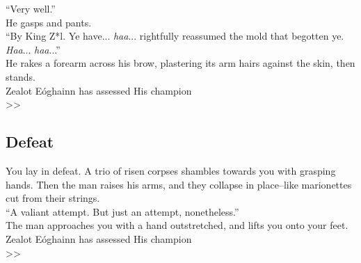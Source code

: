 “Very well.”\\

He gasps and pants.\\
“By King Z*l. Ye have... \emph{haa}... rightfully reassumed the mold that begotten ye. \emph{Haa}... \emph{haa}...”\\

He rakes a forearm across his brow, plastering its arm hairs against the skin, then stands.\\

 Zealot Eóghainn has assessed His champion\\
>> 

\subsection*{Defeat}
You lay in defeat. A trio of risen corpses shambles towards you with grasping hands. Then the man raises his arms, and they collapse in place--like marionettes cut from their strings.\\

“A valiant attempt. But just an attempt, nonetheless.”\\

The man approaches you with a hand outstretched, and lifts you onto your feet.\\

 Zealot Eóghainn has assessed His champion\\
>> 